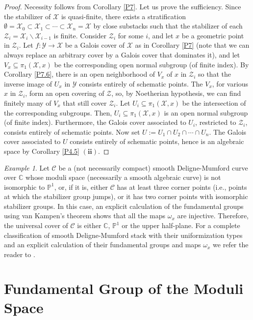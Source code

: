 \documentclass{amsart}
\theoremstyle{definition}
\theoremstyle{remark}
\theoremstyle{remark}
\newtheorem{ex}[thm]{Example}
\newcommand{\X}{\mathcal{X}}
\newcommand{\Y}{\mathcal{Y}}
\newcommand{\Z}{\mathcal{Z}}
\newcommand{\ox}{\omega_x}
\newcommand{\pX}{\pi_1(\X,x)}
\let\:=\colon
\begin{document}
\begin{proof}
Necessity follows from Corollary \ref{P7}.  Let us prove the
sufficiency. Since the stabilizer of $\X$ is quasi-finite, there
exists a stratification $\emptyset=\X_0 \subset \X_1 \subset
\cdots \subset \X_n=\X$ by close substacks such that the
stabilizer of each $\Z_i=\X_i \backslash \X_{i-1}$ is finite.
Consider $\Z_i$ for some $i$, and let $x$ be a geometric point in
$\Z_i$. Let $f \: \Y \to \X$ be a Galois cover of $\X$ as in
Corollary \ref{P7} (note that we can always replace an arbitrary
cover by a Galois cover that dominates it), and let $V_x \subseteq
\pX$ be the corresponding open normal subgroup (of finite index).
By Corollary \ref{P7.6}, there is an open neighborhood of $V_x$ of
$x$ in $\Z_i$ so that the inverse image of $U_x$ in $\Y$ consists
entirely of schematic points. The $V_x$, for various $x$ in
$\Z_i$, form an open covering of $\Z$, so, by Noetherian
hypothesis, we can find finitely many of $V_x$ that still cover
$\Z_i$. Let $U_i \subseteq \pX$ be the intersection of the
corresponding subgroups. Then, $U_i \subseteq \pX$ is an open
normal subgroup (of finite index). Furthermore, the Galois cover
associated to $U_i$, restricted to $\Z_i$,  consists entirely of
schematic points. Now set $U:=U_1 \cap U_2 \cap \cdots \cap U_n$.
The Galois cover associated to $U$ consists entirely of schematic
points, hence is an algebraic space by Corollary \ref{P4.5}
$(\mathbf{ii})$.
\end{proof}

\begin{ex}
Let $\mathcal{C}$ be a (not necessarily compact) smooth
Deligne-Mumford curve over $\mathbb{C}$ whose moduli space
(necessarily a smooth algebraic curve) is not isomorphic to
$\mathbb{P}^1$, or, if it is, either $\mathcal{C}$ has at least
three corner points (i.e., points at which the stabilizer group
jumps), or it has two corner points with isomorphic stabilizer
groups. In this case, an explicit calculation of the fundamental
groups using van Kampen's theorem shows that all the maps $\ox$
are injective. Therefore, the universal cover of $\mathcal{C}$  is
either $\mathbb{C}$, $\mathbb{P}^1$ or the upper half-plane. For a
complete classification of smooth Deligne-Mumford stack with their
uniformization types and an explicit calculation of their
fundamental groups and maps $\ox$ we refer the reader to
\cite{Unif}.
\end{ex}

\section{Fundamental Group of the Moduli Space}{\label{S:moduli}}
\end{document}
